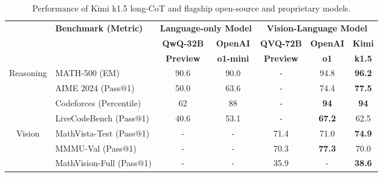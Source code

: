 \begin{table}[h]
    \centering
    \begin{tabular}{@{}c l | c c | c c c@{}}
    \toprule
    & \multirow{3}{*}{\centering \textbf{Benchmark {\tiny (Metric)}}} 
    & \multicolumn{2}{c|}{\textbf{Language-only Model}} 
    & \multicolumn{3}{c}{\textbf{Vision-Language Model}} \\ 
    & & \textbf{QwQ-32B} & \textbf{OpenAI} & \textbf{QVQ-72B} & \textbf{OpenAI} & \textbf{Kimi} \\
    & & \textbf{Preview} & \textbf{o1-mini} & \textbf{Preview} & \textbf{o1} & \textbf{k1.5}  \\
    \midrule

    \multirow{4}{*}{Reasoning}
    & MATH-500 {\tiny (EM)} & 90.6 & 90.0 & - & 94.8 & \textbf{96.2} \\
    & AIME 2024 {\tiny (Pass@1)} & 50.0 & 63.6 & - & 74.4 & \textbf{77.5} \\
    & Codeforces {\tiny (Percentile)} & 62 & 88 & - & \textbf{94} & \textbf{94} \\
    & LiveCodeBench  {\tiny (Pass@1)} & 40.6 & 53.1 & - & \textbf{67.2} & 62.5 \\
    \midrule

    \multirow{3}{*}{Vision} 
    & MathVista-Test {\tiny (Pass@1)} & - & - & 71.4 & 71.0 & \textbf{74.9} \\
    & MMMU-Val {\tiny (Pass@1)} & - & - & 70.3 & \textbf{77.3} & 70.0 \\
    & MathVision-Full {\tiny (Pass@1)} & - & - & 35.9 & - & \textbf{38.6} \\

    \bottomrule
    \end{tabular}
    \vspace{1em}
    \caption{Performance of Kimi k1.5 long-CoT and  flagship open-source and proprietary models.}
    \label{tab:long_perf}
\end{table}
